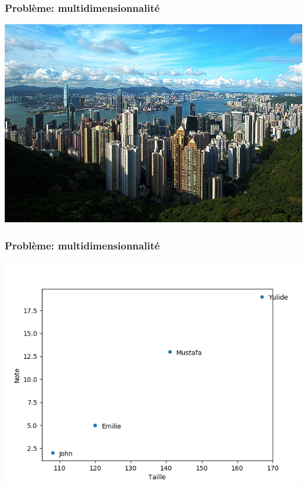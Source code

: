 \documentclass[11pt]{beamer}
\newenvironment{slide}[1]{%
\begin{frame}[environment=slide]
\frametitle{#1}
}{%
\end{frame}
}
\begin{document}
\begin{slide}{Problème: multidimensionnalité}

\begin{center}

\includegraphics[scale=0.95]{hongkong}

\end{center}
\end{slide}

\begin{slide}{Problème: multidimensionnalité}

\begin{center}

\includegraphics[scale=0.4]{plot1}

\end{center}
\end{slide}
\end{document}

